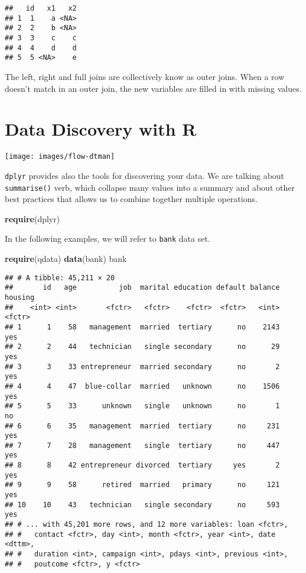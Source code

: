 \documentclass[]{book}
\newenvironment{Shaded}{\begin{snugshade}}{\end{snugshade}}
\newcommand{\KeywordTok}[1]{\textcolor[rgb]{0.13,0.29,0.53}{\textbf{{#1}}}}
\newcommand{\NormalTok}[1]{{#1}}
\begin{document}
\begin{verbatim}
##   id   x1   x2
## 1  1    a <NA>
## 2  2    b <NA>
## 3  3    c    c
## 4  4    d    d
## 5  5 <NA>    e
\end{verbatim}

The left, right and full joins are collectively know as outer joins.
When a row doesn't match in an outer join, the new variables are filled
in with missing values.

\chapter{Data Discovery with R}\label{data-discovery-with-r}

\texttt{[image: images/flow-dtman]}

\texttt{dplyr} provides also the tools for discovering your data. We are
talking about \texttt{summarise()} verb, which collapse many values into
a summary and about other best practices that allows us to combine
together multiple operations.

\begin{Shaded}
\begin{Highlighting}[]
\KeywordTok{require}\NormalTok{(dplyr)}
\end{Highlighting}
\end{Shaded}

In the following examples, we will refer to \texttt{bank} data set.

\begin{Shaded}
\begin{Highlighting}[]
\KeywordTok{require}\NormalTok{(qdata)}
\KeywordTok{data}\NormalTok{(bank)}
\NormalTok{bank}
\end{Highlighting}
\end{Shaded}

\begin{verbatim}
## # A tibble: 45,211 × 20
##       id   age          job  marital education default balance housing
##    <int> <int>       <fctr>   <fctr>    <fctr>  <fctr>   <int>  <fctr>
## 1      1    58   management  married  tertiary      no    2143     yes
## 2      2    44   technician   single secondary      no      29     yes
## 3      3    33 entrepreneur  married secondary      no       2     yes
## 4      4    47  blue-collar  married   unknown      no    1506     yes
## 5      5    33      unknown   single   unknown      no       1      no
## 6      6    35   management  married  tertiary      no     231     yes
## 7      7    28   management   single  tertiary      no     447     yes
## 8      8    42 entrepreneur divorced  tertiary     yes       2     yes
## 9      9    58      retired  married   primary      no     121     yes
## 10    10    43   technician   single secondary      no     593     yes
## # ... with 45,201 more rows, and 12 more variables: loan <fctr>,
## #   contact <fctr>, day <int>, month <fctr>, year <int>, date <dttm>,
## #   duration <int>, campaign <int>, pdays <int>, previous <int>,
## #   poutcome <fctr>, y <fctr>
\end{verbatim}
\end{document}
